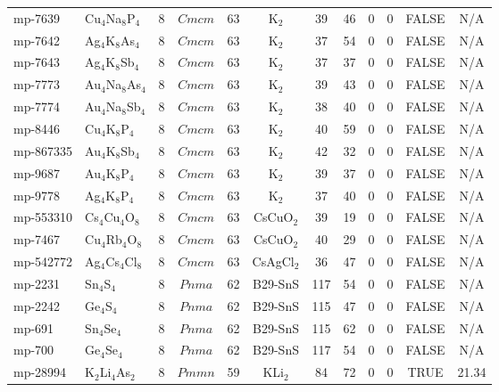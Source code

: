 {\begin{longtable}{llcccccccccc}
    mp-7639 & Cu$_{4}$Na$_{8}$P$_{4}$ & 8     & $Cmcm$ & 63    & K$_{2}$ & 39    & 46    & 0     & 0     & FALSE & N/A \\
    mp-7642 & Ag$_{4}$K$_{8}$As$_{4}$ & 8     & $Cmcm$ & 63    & K$_{2}$ & 37    & 54    & 0     & 0     & FALSE & N/A \\
    mp-7643 & Ag$_{4}$K$_{8}$Sb$_{4}$ & 8     & $Cmcm$ & 63    & K$_{2}$ & 37    & 37    & 0     & 0     & FALSE & N/A \\
    mp-7773 & Au$_{4}$Na$_{8}$As$_{4}$ & 8     & $Cmcm$ & 63    & K$_{2}$ & 39    & 43    & 0     & 0     & FALSE & N/A \\
    mp-7774 & Au$_{4}$Na$_{8}$Sb$_{4}$ & 8     & $Cmcm$ & 63    & K$_{2}$ & 38    & 40    & 0     & 0     & FALSE & N/A \\
    mp-8446 & Cu$_{4}$K$_{8}$P$_{4}$ & 8     & $Cmcm$ & 63    & K$_{2}$ & 40    & 59    & 0     & 0     & FALSE & N/A \\
    mp-867335 & Au$_{4}$K$_{8}$Sb$_{4}$ & 8     & $Cmcm$ & 63    & K$_{2}$ & 42    & 32    & 0     & 0     & FALSE & N/A \\
    mp-9687 & Au$_{4}$K$_{8}$P$_{4}$ & 8     & $Cmcm$ & 63    & K$_{2}$ & 39    & 37    & 0     & 0     & FALSE & N/A \\
    mp-9778 & Ag$_{4}$K$_{8}$P$_{4}$ & 8     & $Cmcm$ & 63    & K$_{2}$ & 37    & 40    & 0     & 0     & FALSE & N/A \\
    mp-553310 & Cs$_{4}$Cu$_{4}$O$_{8}$ & 8     & $Cmcm$ & 63    & CsCuO$_{2}$ & 39    & 19    & 0     & 0     & FALSE & N/A \\
    mp-7467 & Cu$_{4}$Rb$_{4}$O$_{8}$ & 8     & $Cmcm$ & 63    & CsCuO$_{2}$ & 40    & 29    & 0     & 0     & FALSE & N/A \\
    mp-542772 & Ag$_{4}$Cs$_{4}$Cl$_{8}$ & 8     & $Cmcm$ & 63    & CsAgCl$_{2}$ & 36    & 47    & 0     & 0     & FALSE & N/A \\
    mp-2231 & Sn$_{4}$S$_{4}$ & 8     & $Pnma$ & 62    & B29-SnS & 117   & 54    & 0     & 0     & FALSE & N/A \\
    mp-2242 & Ge$_{4}$S$_{4}$ & 8     & $Pnma$ & 62    & B29-SnS & 115   & 47    & 0     & 0     & FALSE & N/A \\
    mp-691 & Sn$_{4}$Se$_{4}$ & 8     & $Pnma$ & 62    & B29-SnS & 115   & 62    & 0     & 0     & FALSE & N/A \\
    mp-700 & Ge$_{4}$Se$_{4}$ & 8     & $Pnma$ & 62    & B29-SnS & 117   & 54    & 0     & 0     & FALSE & N/A \\
    mp-28994 & K$_{2}$Li$_{4}$As$_{2}$ & 8     & $Pmmn$ & 59    & KLi$_{2}$ & 84    & 72    & 0     & 0     & TRUE  & 21.34  \\

\end{longtable}}
